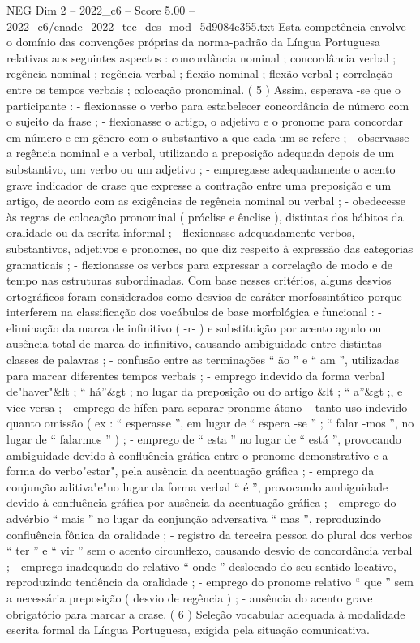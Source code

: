 \begin{textsample}{NEG Dim 2 – 2022\_c6 – Score 5.00 – 2022\_c6/enade\_2022\_tec\_des\_mod\_5d9084e355.txt}
Esta competência envolve o domínio das convenções próprias da norma-padrão da Língua Portuguesa relativas aos seguintes aspectos : concordância nominal ; concordância verbal ; regência nominal ; regência verbal ; flexão nominal ; flexão verbal ; correlação entre os tempos verbais ; colocação pronominal. ( 5 ) Assim, esperava -se que o participante : - flexionasse o verbo para estabelecer concordância de número com o sujeito da frase ; - flexionasse o artigo, o adjetivo e o pronome para concordar em número e em gênero com o substantivo a que cada um se refere ; - observasse a regência nominal e a verbal, utilizando a preposição adequada depois de um substantivo, um verbo ou um adjetivo ; - empregasse adequadamente o acento grave indicador de crase que expresse a contração entre uma preposição e um artigo, de acordo com as exigências de regência nominal ou verbal ; - obedecesse às regras de colocação pronominal ( próclise e ênclise ), distintas dos hábitos da oralidade ou da escrita informal ; - flexionasse adequadamente verbos, substantivos, adjetivos e pronomes, no que diz respeito à expressão das categorias gramaticais ; - flexionasse os verbos para expressar a correlação de modo e de tempo nas estruturas subordinadas.
Com base nesses critérios, alguns desvios ortográficos foram considerados como desvios de caráter morfossintático porque interferem na classificação dos vocábulos de base morfológica e funcional : - eliminação da marca de infinitivo ( -r- ) e substituição por acento agudo ou ausência total de marca do infinitivo, causando ambiguidade entre distintas classes de palavras ; - confusão entre as terminações “ ão ” e “ am ”, utilizadas para marcar diferentes tempos verbais ; - emprego indevido da forma verbal de"haver"\&lt ; “ há”\&gt ; no lugar da preposição ou do artigo \&lt ; “ a”\&gt ;, e vice-versa ; - emprego de hífen para separar pronome átono – tanto uso indevido quanto omissão ( ex : “ esperasse ”, em lugar de “ espera -se ” ; “ falar -mos ”, no lugar de “ falarmos ” ) ; - emprego de “ esta ” no lugar de “ está ”, provocando ambiguidade devido à confluência gráfica entre o pronome demonstrativo e a forma do verbo"estar", pela ausência da acentuação gráfica ; - emprego da conjunção aditiva"e"no lugar da forma verbal “ é ”, provocando ambiguidade devido à confluência gráfica por ausência da acentuação gráfica ; - emprego do advérbio “ mais ” no lugar da conjunção adversativa “ mas ”, reproduzindo confluência fônica da oralidade ; - registro da terceira pessoa do plural dos verbos “ ter ” e “ vir ” sem o acento circunflexo, causando desvio de concordância verbal ; - emprego inadequado do relativo “ onde ” deslocado do seu sentido locativo, reproduzindo tendência da oralidade ; - emprego do pronome relativo “ que ” sem a necessária preposição ( desvio de regência ) ; - ausência do acento grave obrigatório para marcar a crase. ( 6 ) Seleção vocabular adequada à modalidade escrita formal da Língua Portuguesa, exigida pela situação comunicativa.

\end{textsample}
